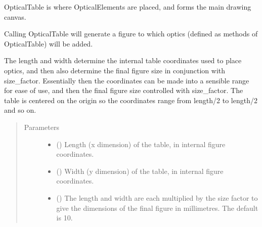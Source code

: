 \documentclass[letterpaper,10pt,english]{sphinxmanual}
\begin{document}
\begin{fulllineitems}
\label{\detokenize{index:pyopticaltable.OpticalTable}}
\sphinxAtStartPar
OpticalTable is where OpticalElements are placed, and forms the main
drawing canvas.

\sphinxAtStartPar
Calling OpticalTable will generate a figure to which optics (defined as
methods of OpticalTable) will be added.

\sphinxAtStartPar
The length and width determine the internal table coordinates used to place
optics, and then also determine the final figure size in conjunction with size\_factor.
Essentially then the coordinates can be made into a sensible range for ease
of use, and then the final figure size controlled with size\_factor.
The table is centered on the origin so the coordinates range from \sphinxhyphen{}length/2
to length/2 and so on.
\begin{quote}\begin{description}
\item[{Parameters}] \leavevmode\begin{itemize}
\item {} 
\sphinxAtStartPar
{} () \textendash{} Length (x dimension) of the table, in internal figure coordinates.

\item {} 
\sphinxAtStartPar
{} () \textendash{} Width (y dimension) of the table, in internal figure coordinates.

\item {} 
\sphinxAtStartPar
{} (\sphinxstyleliteralemphasis{\sphinxupquote{, }}) \textendash{} The length and width are each multiplied by the size factor to give
the dimensions of the final figure in millimetres. The default is 10.


\end{itemize}
\end{description}
\end{quote}
\end{fulllineitems}
\end{document}
